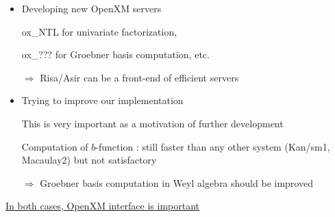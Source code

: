 \begin{slide}{}

\begin{itemize}
\item Developing new OpenXM servers

{ox\_NTL} for univariate factorization, 

{ox\_???} for Groebner basis computation, etc.

$\Rightarrow$ Risa/Asir can be a front-end of efficient servers

\item Trying to improve our implementation

This is very important as a motivation of further development

Computation of $b$-function : still faster than any other system
(Kan/sm1, Macaulay2) but not satisfactory

$\Rightarrow$ Groebner basis computation in Weyl
algebra should be improved
\end{itemize}

\begin{center}
\underline{In both cases, OpenXM interface is important}
\end{center}
\end{slide}


